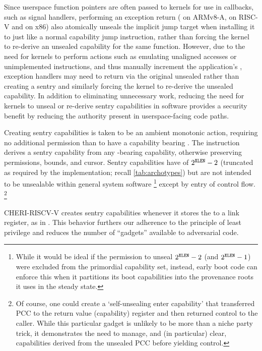 Since userspace function pointers are often passed to kernels for use in
callbacks, such as signal handlers, performing an exception return
( on ARMv8-A, \xRET{} on RISC-V and
 on x86) also atomically unseals the implicit jump target
when installing it to \PCC{} just like a normal capability jump instruction,
rather than forcing the kernel to re-derive an unsealed capability for the same
function. However, due to the need for kernels to perform actions such as
emulating unaligned accesses or unimplemented instructions, and thus manually
increment the application's \PCC{}, exception handlers may need to
return via the original unsealed
\PCC{} rather than creating a sentry and similarly forcing the
kernel to re-derive the unsealed capability. In addition to eliminating
unnecessary work, reducing the need for kernels to unseal or re-derive sentry
capabilities in software provides a security benefit by reducing the authority
present in userspace-facing code paths.

Creating sentry capabilities is taken to be an ambient monotonic action,
requiring no additional permission than to have a capability bearing
\cappermX.
%
The  instruction derives a sentry capability from any
\cappermX-bearing capability, otherwise preserving permissions, bounds,
and cursor.
%
Sentry capabilities have \cotype{} of $2^{{\texttt{XLEN}}{}}-2$ (truncated as required by the
implementation; recall \cref{tab:archotypes}) but are not intended to be
unsealable within general system software%
%
\footnote{While it would be ideal if the permission to unseal \cotype{}
$2^{{\texttt{XLEN}}{}}-2$ (and $2^{{\texttt{XLEN}}{}}-1$) were excluded from the primordial capability set,
instead, early boot code can enforce this when it partitions its boot
capabilities into the provenance roots it uses in the steady state.}
%
except by entry of control flow.%
%
\footnote{Of course, one could create a `self-unsealing enter capability' that
transferred PCC to the return value (capability) register and then returned
control to the caller.  While this particular gadget is unlikely to be more
than a niche party trick, it demonstrates the need to manage, and (in
particular) clear, capabilities derived from the unsealed PCC before yielding
control.}

CHERI-RISCV-V creates sentry capabilities
whenever it stores the \PCC{} to a link register, as in .
This behavior furthers our adherence
to the principle of least privilege and reduces the number of ``gadgets''
available to adversarial code.

